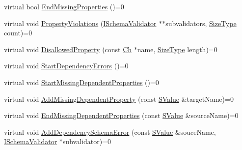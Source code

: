 \begin{DoxyCompactItemize}
\item 
virtual bool \mbox{\hyperlink{classrapidjson_1_1internal_1_1_i_validation_error_handler_a526d70abf63255317a748fccb20041c0}{End\+Missing\+Properties}} ()=0
\item 
virtual void \mbox{\hyperlink{classrapidjson_1_1internal_1_1_i_validation_error_handler_af2e15dd86413c5f6553bb8eccfee7f95}{Property\+Violations}} (\mbox{\hyperlink{classrapidjson_1_1internal_1_1_i_schema_validator}{I\+Schema\+Validator}} $\ast$$\ast$subvalidators, \mbox{\hyperlink{namespacerapidjson_a44eb33eaa523e36d466b1ced64b85c84}{Size\+Type}} count)=0
\item 
virtual void \mbox{\hyperlink{classrapidjson_1_1internal_1_1_i_validation_error_handler_a379825933d795472c421a3998cd1c5f4}{Disallowed\+Property}} (const \mbox{\hyperlink{classrapidjson_1_1internal_1_1_i_validation_error_handler_a02c672a313401138fd08504062f3d1d0}{Ch}} $\ast$name, \mbox{\hyperlink{namespacerapidjson_a44eb33eaa523e36d466b1ced64b85c84}{Size\+Type}} length)=0
\item 
virtual void \mbox{\hyperlink{classrapidjson_1_1internal_1_1_i_validation_error_handler_a953298d04037e20024b69f9032a91e62}{Start\+Dependency\+Errors}} ()=0
\item 
virtual void \mbox{\hyperlink{classrapidjson_1_1internal_1_1_i_validation_error_handler_aff210754c381fc2c79a3de0be7d7af23}{Start\+Missing\+Dependent\+Properties}} ()=0
\item 
virtual void \mbox{\hyperlink{classrapidjson_1_1internal_1_1_i_validation_error_handler_aba0c75f077b1f7197fbb7bcefadad8a3}{Add\+Missing\+Dependent\+Property}} (const \mbox{\hyperlink{classrapidjson_1_1internal_1_1_i_validation_error_handler_a8a2aaf7eb28a3ce7ed81689141f3af1f}{S\+Value}} \&target\+Name)=0
\item 
virtual void \mbox{\hyperlink{classrapidjson_1_1internal_1_1_i_validation_error_handler_a5897d03c7cc4b221896867a712fd18ad}{End\+Missing\+Dependent\+Properties}} (const \mbox{\hyperlink{classrapidjson_1_1internal_1_1_i_validation_error_handler_a8a2aaf7eb28a3ce7ed81689141f3af1f}{S\+Value}} \&source\+Name)=0
\item 
virtual void \mbox{\hyperlink{classrapidjson_1_1internal_1_1_i_validation_error_handler_ac35e4dff861e437141c8c1bd5ac8ca59}{Add\+Dependency\+Schema\+Error}} (const \mbox{\hyperlink{classrapidjson_1_1internal_1_1_i_validation_error_handler_a8a2aaf7eb28a3ce7ed81689141f3af1f}{S\+Value}} \&souce\+Name, \mbox{\hyperlink{classrapidjson_1_1internal_1_1_i_schema_validator}{I\+Schema\+Validator}} $\ast$subvalidator)=0
$$
\end{DoxyCompactItemize}
